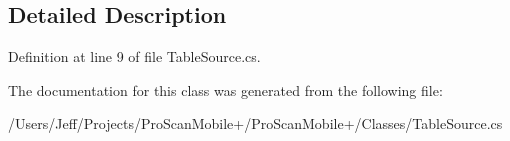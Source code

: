\subsection{Detailed Description}


Definition at line 9 of file Table\-Source.\-cs.



The documentation for this class was generated from the following file\-:\begin{DoxyCompactItemize}
\item 
/\-Users/\-Jeff/\-Projects/\-Pro\-Scan\-Mobile+/\-Pro\-Scan\-Mobile+/\-Classes/Table\-Source.\-cs\end{DoxyCompactItemize}
